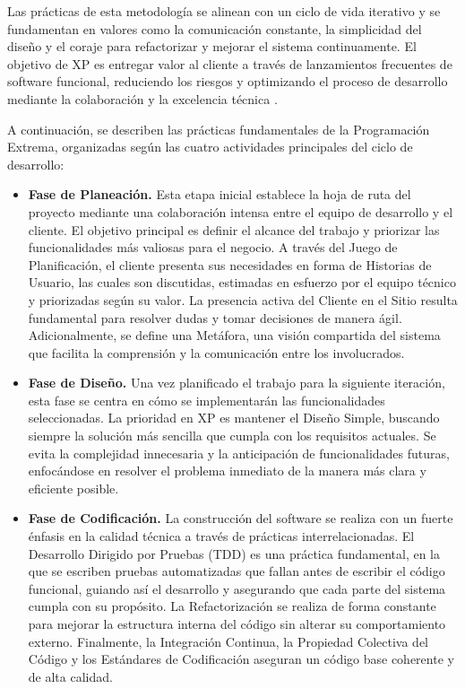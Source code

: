 Las prácticas de esta metodología se alinean con un ciclo de vida iterativo y se fundamentan en valores como la comunicación constante, la simplicidad del diseño y el coraje para refactorizar y mejorar el sistema continuamente. El objetivo de XP es entregar valor al cliente a través de lanzamientos frecuentes de software funcional, reduciendo los riesgos y optimizando el proceso de desarrollo mediante la colaboración y la excelencia técnica \cite{ref47_ganney_xp}.

A continuación, se describen las prácticas fundamentales de la Programación Extrema, organizadas según las cuatro actividades principales del ciclo de desarrollo:

\begin{itemize}[leftmargin=*]
\item \textbf{Fase de Planeación.} Esta etapa inicial establece la hoja de ruta del proyecto mediante una colaboración intensa entre el equipo de desarrollo y el cliente. El objetivo principal es definir el alcance del trabajo y priorizar las funcionalidades más valiosas para el negocio. A través del Juego de Planificación, el cliente presenta sus necesidades en forma de Historias de Usuario, las cuales son discutidas, estimadas en esfuerzo por el equipo técnico y priorizadas según su valor. La presencia activa del Cliente en el Sitio resulta fundamental para resolver dudas y tomar decisiones de manera ágil. Adicionalmente, se define una Metáfora, una visión compartida del sistema que facilita la comprensión y la comunicación entre los involucrados.

\item \textbf{Fase de Diseño.} Una vez planificado el trabajo para la siguiente iteración, esta fase se centra en cómo se implementarán las funcionalidades seleccionadas. La prioridad en XP es mantener el Diseño Simple, buscando siempre la solución más sencilla que cumpla con los requisitos actuales. Se evita la complejidad innecesaria y la anticipación de funcionalidades futuras, enfocándose en resolver el problema inmediato de la manera más clara y eficiente posible.

\item \textbf{Fase de Codificación.} La construcción del software se realiza con un fuerte énfasis en la calidad técnica a través de prácticas interrelacionadas. El Desarrollo Dirigido por Pruebas (TDD) es una práctica fundamental, en la que se escriben pruebas automatizadas que fallan antes de escribir el código funcional, guiando así el desarrollo y asegurando que cada parte del sistema cumpla con su propósito. La Refactorización se realiza de forma constante para mejorar la estructura interna del código sin alterar su comportamiento externo. Finalmente, la Integración Continua, la Propiedad Colectiva del Código y los Estándares de Codificación aseguran un código base coherente y de alta calidad.


\end{itemize}
